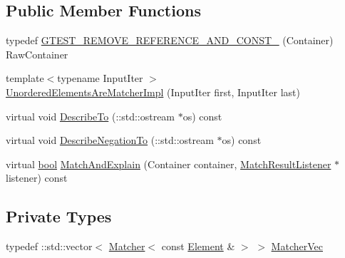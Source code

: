 \subsection*{Public Member Functions}
\begin{DoxyCompactItemize}
\item 
typedef \hyperlink{classtesting_1_1internal_1_1UnorderedElementsAreMatcherImpl_a6e8b7d421741a66ee7f2ebff7372897e}{G\+T\+E\+S\+T\+\_\+\+R\+E\+M\+O\+V\+E\+\_\+\+R\+E\+F\+E\+R\+E\+N\+C\+E\+\_\+\+A\+N\+D\+\_\+\+C\+O\+N\+S\+T\+\_\+} (Container) Raw\+Container
\item 
{\footnotesize template$<$typename Input\+Iter $>$ }\\\hyperlink{classtesting_1_1internal_1_1UnorderedElementsAreMatcherImpl_a0b0f40cf4de84f14020c3d4c9ba06c42}{Unordered\+Elements\+Are\+Matcher\+Impl} (Input\+Iter first, Input\+Iter last)
\item 
virtual void \hyperlink{classtesting_1_1internal_1_1UnorderedElementsAreMatcherImpl_a3f6e292c6452db028b7671618577d9f0}{Describe\+To} (\+::std\+::ostream $\ast$os) const
\item 
virtual void \hyperlink{classtesting_1_1internal_1_1UnorderedElementsAreMatcherImpl_af2185915595c02d6132ba5f3f9ccb6cd}{Describe\+Negation\+To} (\+::std\+::ostream $\ast$os) const
\item 
virtual \hyperlink{classbool}{bool} \hyperlink{classtesting_1_1internal_1_1UnorderedElementsAreMatcherImpl_a4031291eef9be8c1e9e1effdd02c4334}{Match\+And\+Explain} (Container container, \hyperlink{classtesting_1_1MatchResultListener}{Match\+Result\+Listener} $\ast$listener) const
\end{DoxyCompactItemize}
\subsection*{Private Types}
\begin{DoxyCompactItemize}
\item 
typedef \+::std\+::vector$<$ \hyperlink{classtesting_1_1Matcher}{Matcher}$<$ const \hyperlink{classtesting_1_1internal_1_1UnorderedElementsAreMatcherImpl_ad62ba6ff582afe086d522951f94e30d0}{Element} \& $>$ $>$ \hyperlink{classtesting_1_1internal_1_1UnorderedElementsAreMatcherImpl_afc098105ab7ac15cba95ca34644f0cef}{Matcher\+Vec}
\end{DoxyCompactItemize}
